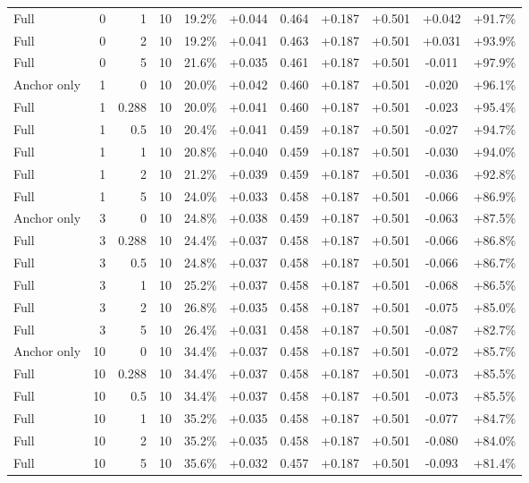 \begin{table}[htbp]
\begin{tabular}{lrrrccccccc}
Full & 0 & 1 & 10 & 19.2\% & +0.044 & 0.464 & +0.187 & +0.501 & +0.042 & +91.7\% \\
Full & 0 & 2 & 10 & 19.2\% & +0.041 & 0.463 & +0.187 & +0.501 & +0.031 & +93.9\% \\
Full & 0 & 5 & 10 & 21.6\% & +0.035 & 0.461 & +0.187 & +0.501 & -0.011 & +97.9\% \\
Anchor only & 1 & 0 & 10 & 20.0\% & +0.042 & 0.460 & +0.187 & +0.501 & -0.020 & +96.1\% \\
Full & 1 & 0.288 & 10 & 20.0\% & +0.041 & 0.460 & +0.187 & +0.501 & -0.023 & +95.4\% \\
Full & 1 & 0.5 & 10 & 20.4\% & +0.041 & 0.459 & +0.187 & +0.501 & -0.027 & +94.7\% \\
Full & 1 & 1 & 10 & 20.8\% & +0.040 & 0.459 & +0.187 & +0.501 & -0.030 & +94.0\% \\
Full & 1 & 2 & 10 & 21.2\% & +0.039 & 0.459 & +0.187 & +0.501 & -0.036 & +92.8\% \\
Full & 1 & 5 & 10 & 24.0\% & +0.033 & 0.458 & +0.187 & +0.501 & -0.066 & +86.9\% \\
Anchor only & 3 & 0 & 10 & 24.8\% & +0.038 & 0.459 & +0.187 & +0.501 & -0.063 & +87.5\% \\
Full & 3 & 0.288 & 10 & 24.4\% & +0.037 & 0.458 & +0.187 & +0.501 & -0.066 & +86.8\% \\
Full & 3 & 0.5 & 10 & 24.8\% & +0.037 & 0.458 & +0.187 & +0.501 & -0.066 & +86.7\% \\
Full & 3 & 1 & 10 & 25.2\% & +0.037 & 0.458 & +0.187 & +0.501 & -0.068 & +86.5\% \\
Full & 3 & 2 & 10 & 26.8\% & +0.035 & 0.458 & +0.187 & +0.501 & -0.075 & +85.0\% \\
Full & 3 & 5 & 10 & 26.4\% & +0.031 & 0.458 & +0.187 & +0.501 & -0.087 & +82.7\% \\
Anchor only & 10 & 0 & 10 & 34.4\% & +0.037 & 0.458 & +0.187 & +0.501 & -0.072 & +85.7\% \\
Full & 10 & 0.288 & 10 & 34.4\% & +0.037 & 0.458 & +0.187 & +0.501 & -0.073 & +85.5\% \\
Full & 10 & 0.5 & 10 & 34.4\% & +0.037 & 0.458 & +0.187 & +0.501 & -0.073 & +85.5\% \\
Full & 10 & 1 & 10 & 35.2\% & +0.035 & 0.458 & +0.187 & +0.501 & -0.077 & +84.7\% \\
Full & 10 & 2 & 10 & 35.2\% & +0.035 & 0.458 & +0.187 & +0.501 & -0.080 & +84.0\% \\
Full & 10 & 5 & 10 & 35.6\% & +0.032 & 0.457 & +0.187 & +0.501 & -0.093 & +81.4\% \\

\end{tabular}
\end{table}
